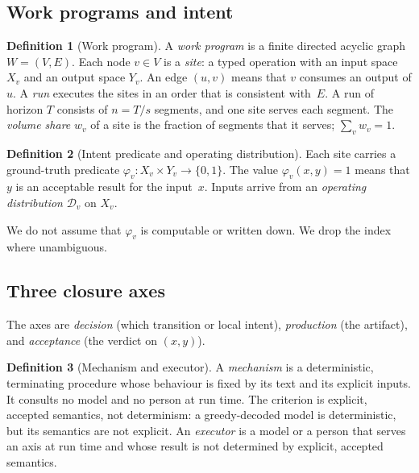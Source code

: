 \documentclass[11pt]{article}
\theoremstyle{definition}
\newtheorem{definition}{Definition}
\theoremstyle{remark}
\newcommand{\D}{\mathcal{D}}
\begin{document}
\subsection{Work programs and intent}\label{sec:workprogram}
\begin{definition}[Work program]\label{def:wp}
A \emph{work program} is a finite directed acyclic graph $W=(V,E)$. Each node $v\in V$ is a
\emph{site}: a typed operation with an input space $X_v$ and an output space $Y_v$. An edge $(u,v)$
means that $v$ consumes an output of $u$. A \emph{run} executes the sites in an order that is
consistent with~$E$. A run of horizon $T$ consists of $n=T/s$ segments, and one site serves each
segment. The \emph{volume share} $w_v$ of a site is the fraction of segments that it serves;
$\sum_v w_v=1$.
\end{definition}

\begin{definition}[Intent predicate and operating distribution]\label{def:intent}
Each site carries a ground-truth predicate $\varphi_v:X_v\times Y_v\to\{0,1\}$. The value
$\varphi_v(x,y)=1$ means that $y$ is an acceptable result for the input~$x$. Inputs arrive from an
\emph{operating distribution} $\D_v$ on $X_v$.
\end{definition}
We do not assume that $\varphi_v$ is computable or written down. We drop the index where unambiguous.

\subsection{Three closure axes}\label{sec:axes}
The axes are \emph{decision} (which transition or local intent), \emph{production} (the artifact),
and \emph{acceptance} (the verdict on $(x,y)$).

\begin{definition}[Mechanism and executor]\label{def:mech}
A \emph{mechanism} is a deterministic, terminating procedure whose behaviour is fixed by its text and
its explicit inputs. It consults no model and no person at run time. The criterion is explicit, accepted semantics, not
determinism: a greedy-decoded model is deterministic, but its semantics are not explicit. An \emph{executor} is a model or
a person that serves an axis at run time and whose result is not determined by explicit, accepted
semantics.
\end{definition}
\end{document}
